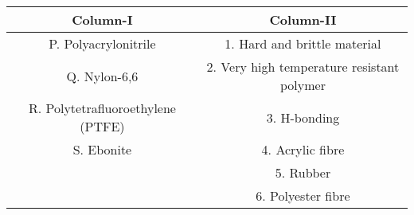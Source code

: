 \begin{tabular}{|c|c|} 
        \hline
        \textbf{Column-I} & \textbf{Column-II} \\
        \hline
        P. Polyacrylonitrile & 1. Hard and brittle material \\
        \hline
        Q. Nylon-6,6 & 2. Very high temperature resistant polymer \\
        \hline
        R. Polytetrafluoroethylene (PTFE) & 3. H-bonding\\
        \hline
        S. Ebonite & 4. Acrylic fibre \\
        \hline
         & 5. Rubber \\
        \hline
          &6. Polyester fibre \\
        \hline
    \end{tabular}
